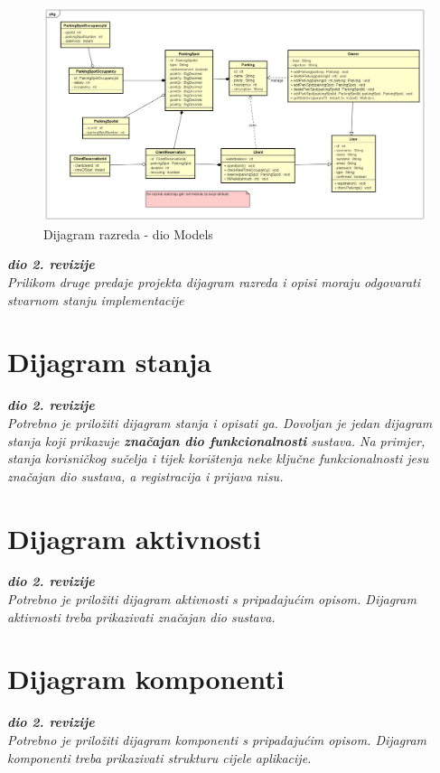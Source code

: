 \begin{figure}[H]
	
	\includegraphics[width=\textwidth]{slike/model.png} %
	\centering
	\caption{Dijagram razreda - dio Models}
	\label{fig:models}
\end{figure}

\eject

\textbf{\textit{dio 2. revizije}}\\			

\textit{Prilikom druge predaje projekta dijagram razreda i opisi moraju odgovarati stvarnom stanju implementacije}



\eject

\section{Dijagram stanja}


\textbf{\textit{dio 2. revizije}}\\

\textit{Potrebno je priložiti dijagram stanja i opisati ga. Dovoljan je jedan dijagram stanja koji prikazuje \textbf{značajan dio funkcionalnosti} sustava. Na primjer, stanja korisničkog sučelja i tijek korištenja neke ključne funkcionalnosti jesu značajan dio sustava, a registracija i prijava nisu. }


\eject 

\section{Dijagram aktivnosti}

\textbf{\textit{dio 2. revizije}}\\

\textit{Potrebno je priložiti dijagram aktivnosti s pripadajućim opisom. Dijagram aktivnosti treba prikazivati značajan dio sustava.}

\eject
\section{Dijagram komponenti}

\textbf{\textit{dio 2. revizije}}\\

\textit{Potrebno je priložiti dijagram komponenti s pripadajućim opisom. Dijagram komponenti treba prikazivati strukturu cijele aplikacije.}